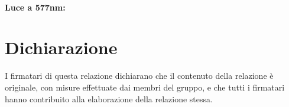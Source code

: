 \documentclass[10pt,a4paper]{article}
\begin{document}
\paragraph{Luce a 577nm:}



\section*{Dichiarazione}
I firmatari di questa relazione dichiarano che il contenuto della relazione \`e originale, con misure effettuate dai membri del gruppo, e che tutti i firmatari hanno contribuito alla elaborazione della relazione stessa.
\end{document}
